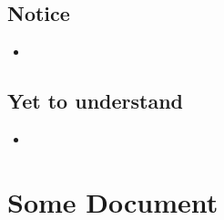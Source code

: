 \documentclass{article}
\begin{document}
\subsection{Notice}

    \begin{itemize}

    \item 
    
    \end{itemize}

\subsection{Yet to understand}

    \begin{itemize}

    \item 
    
    \end{itemize}

\section{Some Document}
\end{document}
